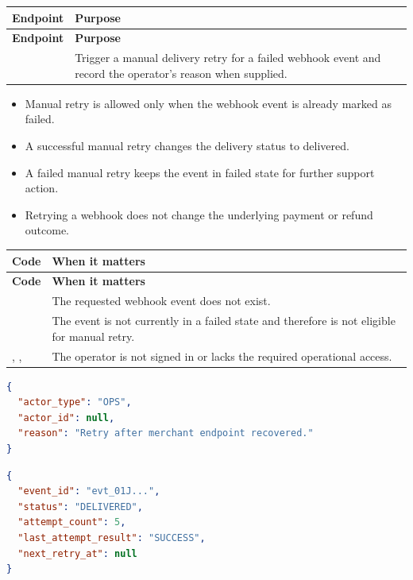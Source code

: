 \begin{longtable}{@{}L{0.34\textwidth}L{0.56\textwidth}@{}}
\toprule
\textbf{Endpoint} & \textbf{Purpose} \\
\midrule
\endfirsthead
\toprule
\textbf{Endpoint} & \textbf{Purpose} \\
\midrule
\endhead
{} & Trigger a manual delivery retry
for a failed webhook event and record the operator's reason when supplied. \\
\bottomrule
\end{longtable}

\begin{itemize}
  \item Manual retry is allowed only when the webhook event is already marked as
  failed.
  \item A successful manual retry changes the delivery status to delivered.
  \item A failed manual retry keeps the event in failed state for further
  support action.
  \item Retrying a webhook does not change the underlying payment or refund
  outcome.
\end{itemize}

\begin{longtable}{@{}L{0.31\textwidth}L{0.59\textwidth}@{}}
\toprule
\textbf{Code} & \textbf{When it matters} \\
\midrule
\endfirsthead
\toprule
\textbf{Code} & \textbf{When it matters} \\
\midrule
\endhead
{} & The requested webhook event does not exist. \\
\bodyrowrule
{} & The event is not currently in a failed state
and therefore is not eligible for manual retry. \\
\bodyrowrule
{}, ,
 & The operator is not signed in or lacks the
required operational access. \\
\bottomrule
\end{longtable}

\begin{lstlisting}[language=json,caption={Manual webhook retry request example}]
{
  "actor_type": "OPS",
  "actor_id": null,
  "reason": "Retry after merchant endpoint recovered."
}
\end{lstlisting}

\begin{lstlisting}[language=json,caption={Manual webhook retry response example}]
{
  "event_id": "evt_01J...",
  "status": "DELIVERED",
  "attempt_count": 5,
  "last_attempt_result": "SUCCESS",
  "next_retry_at": null
}
\end{lstlisting}
